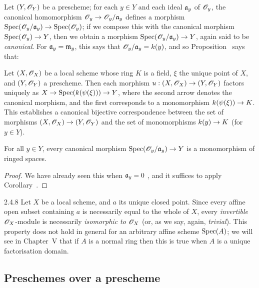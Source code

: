 Let $(Y,\mathscr{O}_Y)$ be a prescheme;
for each $y\in Y$ and each ideal $\mathfrak{a}_y$ of $\mathscr{O}_y$, the canonical homomorphism $\OO_y\to\OO_y/\fk{a}_y$ defines a morphism $\Spec(\OO_y/\fk{a}_y)\to\Spec(\OO_y)$;
if we compose this with the canonical morphism $\Spec(\OO_y)\to Y$, then we obtain a morphism $\Spec(\OO_y/\fk{a}_y)\to Y$, again said to be \textit{canonical}.
For $\mathfrak{a}_y=\mathfrak{m}_y$, this says that $\mathscr{O}_y/\mathfrak{a}_y=k(y)$, and so Proposition~ says that:

\begin{cor}[2.4.6]
\label{1.2.4.6}
Let $(X,\mathscr{O}_X)$ be a local scheme whose ring $K$ is a field, $\xi$ the unique point of $X$, and $(Y,\mathscr{O}_Y)$ a prescheme.
Then each morphism $u:(X,\OO_X)\to(Y,\OO_Y)$ factors uniquely as $X\to\Spec(\kres(\psi(\xi)))\to Y$, where the second arrow denotes the canonical morphism, and the first corresponds to a monomorphism $\kres(\psi(\xi))\to K$.
This establishes a canonical bijective correspondence between the set of morphisms $(X,\OO_X)\to (Y,\OO_Y)$ and the set of monomorphisms $\kres(y)\to K$ (for $y\in Y$).
\end{cor}

\begin{cor}[2.4.7]
\label{1.2.4.7}
For all $y\in Y$, every canonical morphism $\Spec(\OO_y/\fk{a}_y)\to Y$ is a monomorphism of ringed spaces.
\end{cor}

\begin{proof}
\label{proof-1.2.4.7}
We have already seen this when $\mathfrak{a}_y=0$ , and it suffices to apply Corollary~.
\end{proof}

\begin{rmk}{2.4.8}
\label{1.2.4.8}
Let $X$ be a local scheme, and $a$ its unique closed point.
Since every affine open subset containing $a$ is necessarily equal to the whole of $X$, every \emph{invertible} $\mathscr{O}_X$-module  is necessarily \emph{isomorphic to $\mathscr{O}_X$} (or, as we say, again, \emph{trivial}).
This property does not hold in general for an arbitrary affine scheme ${\mathop{\mathrm{Spec}}\nolimits}(A)$;
we will see in Chapter~V that if $A$ is a normal ring then this is true when $A$ is a unique factorisation domain.
\end{rmk}

\subsection{Preschemes over a prescheme}
\label{subsection:preschemes-over-prescheme}

